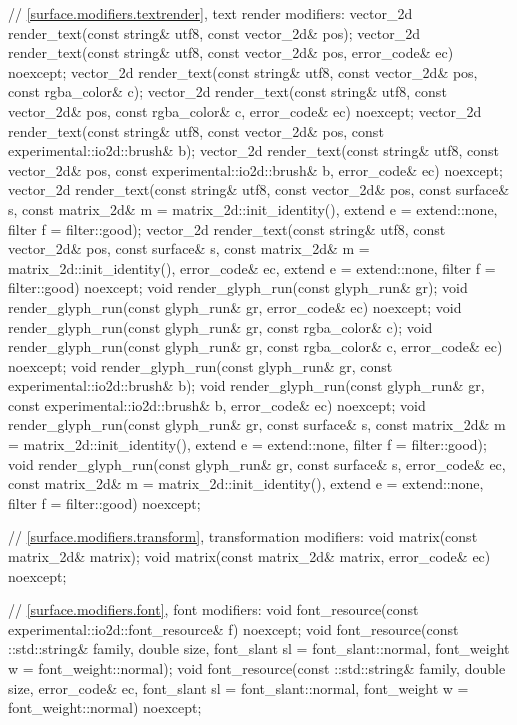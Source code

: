 \begin{codeblock}
{{{{{    // \ref{surface.modifiers.textrender}, text render modifiers:
    vector_2d render_text(const string& utf8, const vector_2d& pos);
    vector_2d render_text(const string& utf8, const vector_2d& pos,
      error_code& ec) noexcept;
    vector_2d render_text(const string& utf8, const vector_2d& pos,
      const rgba_color& c);
    vector_2d render_text(const string& utf8, const vector_2d& pos,
      const rgba_color& c, error_code& ec) noexcept;
    vector_2d render_text(const string& utf8, const vector_2d& pos,
      const experimental::io2d::brush& b);
    vector_2d render_text(const string& utf8, const vector_2d& pos,
      const experimental::io2d::brush& b, error_code& ec) noexcept;
    vector_2d render_text(const string& utf8, const vector_2d& pos,
      const surface& s, const matrix_2d& m = matrix_2d::init_identity(),
      extend e = extend::none, filter f = filter::good);
    vector_2d render_text(const string& utf8, const vector_2d& pos,
      const surface& s, const matrix_2d& m = matrix_2d::init_identity(),
      error_code& ec, extend e = extend::none,
      filter f = filter::good) noexcept;
    void render_glyph_run(const glyph_run& gr);
    void render_glyph_run(const glyph_run& gr, error_code& ec) noexcept;
    void render_glyph_run(const glyph_run& gr, const rgba_color& c);
    void render_glyph_run(const glyph_run& gr, const rgba_color& c,
      error_code& ec) noexcept;
    void render_glyph_run(const glyph_run& gr,
      const experimental::io2d::brush& b);
    void render_glyph_run(const glyph_run& gr,
      const experimental::io2d::brush& b, error_code& ec) noexcept;
    void render_glyph_run(const glyph_run& gr, const surface& s,
      const matrix_2d& m = matrix_2d::init_identity(), extend e = extend::none,
      filter f = filter::good);
    void render_glyph_run(const glyph_run& gr, const surface& s,
      error_code& ec, const matrix_2d& m = matrix_2d::init_identity(),
      extend e = extend::none, filter f = filter::good) noexcept;
    
    // \ref{surface.modifiers.transform}, transformation modifiers:
    void matrix(const matrix_2d& matrix);
    void matrix(const matrix_2d& matrix, error_code& ec) noexcept;
    
    // \ref{surface.modifiers.font}, font modifiers:
    void font_resource(const experimental::io2d::font_resource& f) noexcept;
    void font_resource(const ::std::string& family, double size,
      font_slant sl = font_slant::normal, font_weight w = font_weight::normal);
    void font_resource(const ::std::string& family, double size,
      error_code& ec, font_slant sl = font_slant::normal,
      font_weight w = font_weight::normal) noexcept;
    
}}}}}
\end{codeblock}
